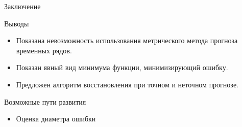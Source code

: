 \documentclass{beamer}
\begin{document}
\begin{frame}{Заключение}
    \begin{block}{Выводы}
    \begin{itemize}
        \item Показана невозможность использования метрического метода прогноза временных рядов.
        \item Показан явный вид минимума функции, минимизирующий ошибку.
        \item Предложен алгоритм восстановления при точном и неточном прогнозе.
    \end{itemize}
    \end{block}
    \begin{block}{Возможные пути развития}
    \begin{itemize}
    	\item Оценка диаметра ошибки
    \end{itemize}
    \end{block}
\end{frame}
\end{document}
